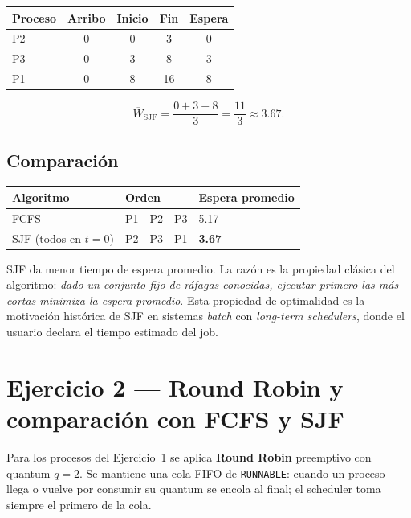 \documentclass[11pt,a4paper]{article}
\begin{document}
\begin{center}
\small
\begin{tabular}{@{}lcccc@{}}
\toprule
Proceso & Arribo & Inicio & Fin & Espera \\
\midrule
P2 & 0 & 0 & 3  & 0 \\
P3 & 0 & 3 & 8  & 3 \\
P1 & 0 & 8 & 16 & 8 \\
\bottomrule
\end{tabular}
\end{center}

\[
\overline{W}_{\text{SJF}}
= \frac{0 + 3 + 8}{3} = \frac{11}{3} \approx 3.67.
\]

\subsection*{Comparación}

\begin{center}
\small
\begin{tabular}{@{}lll@{}}
\toprule
Algoritmo & Orden & Espera promedio \\
\midrule
FCFS & P1 - P2 - P3 & 5.17 \\
SJF (todos en $t=0$) & P2 - P3 - P1 & \textbf{3.67} \\
\bottomrule
\end{tabular}
\end{center}

SJF da menor tiempo de espera promedio. La razón es la propiedad
clásica del algoritmo: \emph{dado un conjunto fijo de ráfagas
conocidas, ejecutar primero las más cortas minimiza la espera
promedio}. Esta propiedad de optimalidad es la motivación histórica
de SJF en sistemas \emph{batch} con \emph{long-term schedulers},
donde el usuario declara el tiempo estimado del job.

\section{Ejercicio 2 --- Round Robin y comparación con FCFS y SJF}

Para los procesos del Ejercicio~1 se aplica \textbf{Round Robin}
preemptivo con quantum $q = 2$. Se mantiene una cola FIFO de
\texttt{RUNNABLE}: cuando un proceso llega o vuelve por consumir su
quantum se encola al final; el scheduler toma siempre el primero de
la cola.
\end{document}
